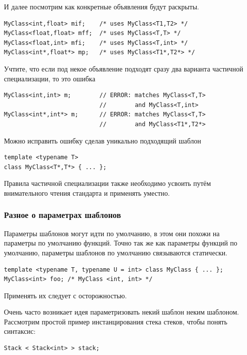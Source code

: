 \documentclass[a4paper,12pt,oneside]{article}
\begin{document}
И далее посмотрим как конкретные объявления будут раскрыты.

\begin{lstlisting}
MyClass<int,float> mif;    /* uses MyClass<T1,T2> */ 
MyClass<float,float> mff;  /* uses MyClass<T,T> */ 
MyClass<float,int> mfi;    /* uses MyClass<T,int> */ 
MyClass<int*,float*> mp;   /* uses MyClass<T1*,T2*> */
\end{lstlisting}

Учтите, что если под некое объявление подходят сразу два варианта частичной специализации, то это ошибка

\begin{lstlisting}
MyClass<int,int> m;        // ERROR: matches MyClass<T,T> 
                           //        and MyClass<T,int> 
MyClass<int*,int*> m;      // ERROR: matches MyClass<T,T> 
                           //        and MyClass<T1*,T2*>
\end{lstlisting}

Можно исправить ошибку сделав уникально подходящий шаблон

\begin{lstlisting}
template <typename T> 
class MyClass<T*,T*> { ... };
\end{lstlisting}

Правила частичной специализации также необходимо усвоить путём внимательного чтения стандарта и применять уместно.

\subsubsection{Разное о параметрах шаблонов}

Параметры шаблонов могут идти по умолчанию, в этом они похожи на параметры по умолчанию функций. Точно так же как параметры функций по умолчанию, параметры шаблонов по умолчанию связываются статически.

\begin{lstlisting}
template <typename T, typename U = int> class MyClass { ... };
MyClass<int> foo; /* MyClass <int, int> */
\end{lstlisting}

Применять их следует с осторожностью.

Очень часто возникает идея параметризовать некий шаблон неким шаблоном. Рассмотрим простой пример инстанцирования стека стеков, чтобы понять синтаксис:

\begin{lstlisting}
Stack < Stack<int> > stack;
\end{lstlisting}
\end{document}
